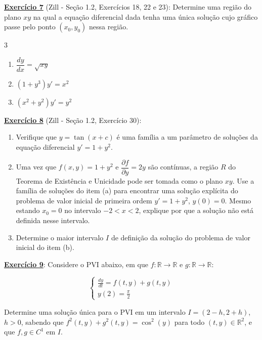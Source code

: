\documentclass[oneside,12pt,a4paper]{report}
\begin{document}
    \noindent\textbf{\hyperlink{resp:ex7}{\hypertarget{quest:ex7}{Exercício 7}}} (Zill - Seção 1.2, Exercícios 18, 22 e 23): Determine uma região do plano $xy$ na qual a equação diferencial dada tenha uma única solução cujo gráfico passe pelo ponto $(x_0,y_0)$ nessa região.
    \begin{multicols}{3}
        \begin{enumerate}[label=\alph*)]
            \item $\dfrac{dy}{dx}=\sqrt{xy}$
            \item $(1+y^3)y'=x^2$
            \item $(x^2+y^2)y'=y^2$
        \end{enumerate}
    \end{multicols}
    \vspace{0.5cm}

    \noindent\textbf{\hyperlink{resp:ex8}{\hypertarget{quest:ex8}{Exercício 8}}} (Zill - Seção 1.2, Exercício 30): 
    \begin{enumerate}[label=\alph*)]
        \item Verifique que $y=\tan(x+c)$ é uma família a um parâmetro de soluções da equação diferencial $y'=1+y^2$.
        \item Uma vez que $f(x,y)=1+y^2$ e $\dfrac{\partial f}{\partial y}=2y$ são contínuas, a região $R$ do Teorema de Existência e Unicidade pode ser tomada como o plano $xy$. Use a família de soluções do item (a) para encontrar uma solução explícita do problema de valor inicial de primeira ordem $y'=1+y^2$, $y(0)=0$. Mesmo estando $x_0=0$ no intervalo $-2<x<2$, explique por que a solução não está definida nesse intervalo.
        \item Determine o maior intervalo $I$ de definição da solução do problema de valor inicial do item (b).
    \end{enumerate}
    \vspace{0.5cm}

    \noindent\textbf{\hyperlink{resp:ex9}{\hypertarget{quest:ex9}{Exercício 9}}}: Considere o PVI abaixo, em que $f:\mathbb{R}\to\mathbb{R}$ e $g:\mathbb{R}\to\mathbb{R}$:

    \[
    \begin{cases} 
    \frac{dy}{dt} = f(t,y) + g(t,y) \\ 
    y(2) = \frac{\pi}{2}
    \end{cases}
    \]

    \noindent Determine uma solução única para o PVI em um intervalo $I=(2-h, 2+h)$, $h>0$, sabendo que $f^2(t,y) + g^2(t,y) = \cos^2(y)$ para todo $(t,y) \in \mathbb{R}^2$, e que $f, g \in C^1$ em $I$.
    \vspace{0.5cm}
\end{document}
